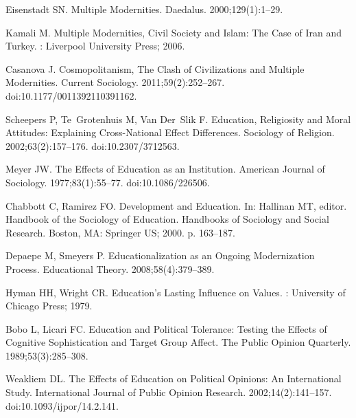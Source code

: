 \documentclass[10pt,letterpaper]{article}
\begin{document}
\begin{thebibliography}{10}
Eisenstadt SN.
\newblock Multiple {{Modernities}}.
\newblock Daedalus. 2000;129(1):1--29.

Kamali M.
\newblock Multiple {{Modernities}}, {{Civil Society}} and {{Islam}}: The
  {{Case}} of {{Iran}} and {{Turkey}}.
: {Liverpool University Press}; 2006.

Casanova J.
\newblock Cosmopolitanism, {{The Clash}} of {{Civilizations}} and {{Multiple
  Modernities}}.
\newblock Current Sociology. 2011;59(2):252--267.
\newblock doi:{10.1177/0011392110391162}.

Scheepers P, Te~Grotenhuis M, Van Der~Slik F.
\newblock Education, {{Religiosity}} and {{Moral Attitudes}}: {{Explaining
  Cross}}-{{National Effect Differences}}.
\newblock Sociology of Religion. 2002;63(2):157--176.
\newblock doi:{10.2307/3712563}.

Meyer JW.
\newblock The {{Effects}} of {{Education}} as an {{Institution}}.
\newblock American Journal of Sociology. 1977;83(1):55--77.
\newblock doi:{10.1086/226506}.

Chabbott C, Ramirez FO.
\newblock Development and {{Education}}.
\newblock In: Hallinan MT, editor. Handbook of the {{Sociology}} of
  {{Education}}. Handbooks of {{Sociology}} and {{Social Research}}. {Boston,
  MA}: {Springer US}; 2000. p. 163--187.

Depaepe M, Smeyers P.
\newblock Educationalization as an {{Ongoing Modernization Process}}.
\newblock Educational Theory. 2008;58(4):379--389.

Hyman HH, Wright CR.
\newblock Education's {{Lasting Influence}} on {{Values}}.
: {University of Chicago Press}; 1979.

Bobo L, Licari FC.
\newblock Education and {{Political Tolerance}}: {{Testing}} the {{Effects}} of
  {{Cognitive Sophistication}} and {{Target Group Affect}}.
\newblock The Public Opinion Quarterly. 1989;53(3):285--308.

Weakliem DL.
\newblock The {{Effects}} of {{Education}} on {{Political Opinions}}: {{An
  International Study}}.
\newblock International Journal of Public Opinion Research.
  2002;14(2):141--157.
\newblock doi:{10.1093/ijpor/14.2.141}.


\end{thebibliography}
\end{document}
